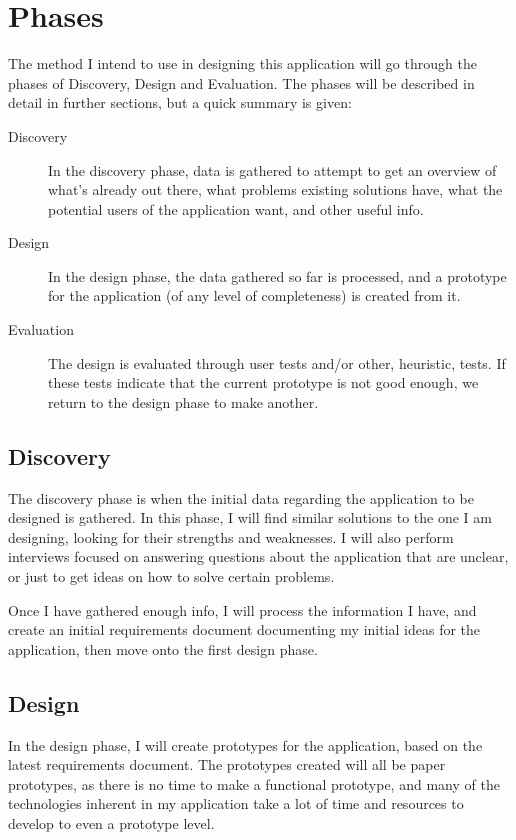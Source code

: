 \documentclass[]{report}
\begin{document}
\section{Phases}

The method I intend to use in designing this application will go through the
phases of Discovery, Design and Evaluation. The phases will be described in
detail in further sections, but a quick summary is given:

\begin{description}
\item[Discovery] In the discovery phase, data is gathered to attempt to get an
  overview of what's already out there, what problems existing solutions have,
  what the potential users of the application want, and other useful info.
\item[Design] In the design phase, the data gathered so far is processed, and a
  prototype for the application (of any level of completeness) is created from
  it.
\item[Evaluation] The design is evaluated through user tests and/or other,
  heuristic, tests. If these tests indicate that the current prototype is not
  good enough, we return to the design phase to make another.
\end{description}

\subsection{Discovery}

The discovery phase is when the initial data regarding the application to be
designed is gathered. In this phase, I will find similar solutions to the one I
am designing, looking for their strengths and weaknesses. I will also perform
interviews focused on answering questions about the application that are
unclear, or just to get ideas on how to solve certain problems.

Once I have gathered enough info, I will process the information I have, and
create an initial requirements document documenting my initial ideas for the
application, then move onto the first design phase.

\subsection{Design}

In the design phase, I will create prototypes for the application, based on the
latest requirements document. The prototypes created will all be paper
prototypes, as there is no time to make a functional prototype, and many of the
technologies inherent in my application take a lot of time and resources to
develop to even a prototype level.
\end{document}
